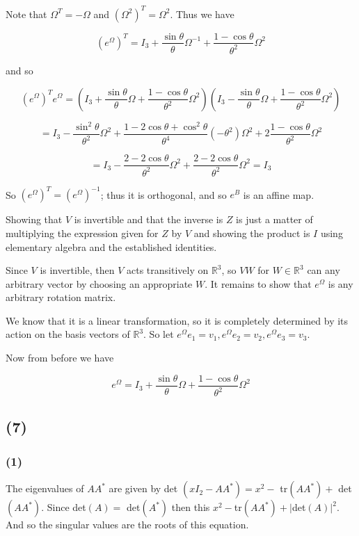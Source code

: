 \documentclass{article}
\begin{document}
Note that $\Omega^T = -\Omega$ and $(\Omega^2)^T = \Omega^2$. Thus we have 

\[ (e^{\Omega})^T = I_3 + \dfrac{\sin \theta}{\theta} \Omega^{-1} + \dfrac{1 - \cos \theta}{\theta^2} \Omega^2 \]

and so 

\newpage

\[ (e^{\Omega})^T e^{\Omega} = \left(I_3 + \dfrac{\sin \theta}{\theta} \Omega + \dfrac{1 - \cos \theta}{\theta^2} \Omega^2 \right) \left(I_3 - \dfrac{\sin \theta}{\theta} \Omega + \dfrac{1 - \cos \theta}{\theta^2} \Omega^2 \right) \]

\[ = I_3 - \dfrac{\sin^2 \theta}{\theta^2} \Omega^2 + \dfrac{1 - 2\cos \theta + \cos^2 \theta}{\theta^4} (-\theta^2) \Omega^2  + 2\dfrac{1 - \cos \theta}{\theta^2} \Omega^2\]

\[ = I_3 - \dfrac{2 - 2 \cos \theta}{\theta^2} \Omega^2 + \dfrac{2 - 2 \cos \theta}{\theta^2} \Omega^2 = I_3\]

So $(e^{\Omega})^T = (e^{\Omega})^{-1}$; thus it is orthogonal, and so $e^B$ is an affine map. 

Showing that $V$ is invertible and that the inverse is $Z$ is just a matter of multiplying the expression given for $Z$ by $V$ and showing the product is $I$ using elementary algebra and the established identities. 

Since $V$ is invertible, then $V$ acts transitively on $\mathbb{R}^3$, so $VW$ for $W \in \mathbb{R}^3$ can any arbitrary vector by choosing an appropriate $W$. It remains to show that $e^{\Omega}$ is any arbitrary rotation matrix. 

We know that it is a linear transformation, so it is completely determined by its action on the basis vectors of $\mathbb{R}^3$. So let $e^{\Omega} e_1 = v_1, e^{\Omega} e_2 = v_2, e^{\Omega} e_3 = v_3$. 

Now from before we have 

\[ e^{\Omega} = I_3+ \dfrac{\sin \theta}{\theta} \Omega + \dfrac{1 - \cos \theta}{\theta^2} \Omega^2 \]

\subsection{(7)}

\subsubsection{(1)}
The eigenvalues of $AA^*$ are given by det $(xI_2 - AA^*) = x^2 - $ tr$(AA^*) + $ det$(AA^*)$. Since det$(A) = $ det$(A^*)$ then this $x^2 - $tr$(AA^*) + |$det$(A)|^2$. And so the singular values are the roots of this equation. 
\end{document}

